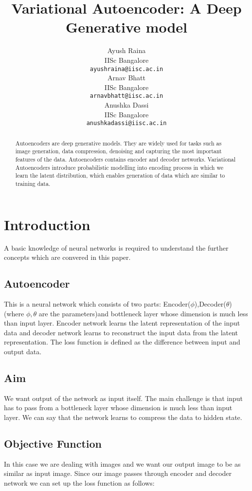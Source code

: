 \documentclass[10pt,a4paper]{article}
\title{Variational Autoencoder: A Deep Generative model}
\author{
  Ayush Raina \\
  IISc Bangalore \\
  \texttt{ayushraina@iisc.ac.in} \\
  \And
  Arnav Bhatt \\
  IISc Bangalore \\
  \texttt{arnavbhatt@iisc.ac.in} \\
  \AND
  Anushka Dassi \\
  IISc Bangalore \\
  \texttt{anushkadassi@iisc.ac.in} \\
}
\begin{document}
\maketitle


\begin{abstract}
  Autoencoders are deep generative models. They are widely used for tasks such as image generation, data compression, denoising and capturing the most important features of the data. Autoencoders contains encoder and decoder networks. Variational Autoencoders introduce probabilistic modelling into encoding process in which we learn the latent distribution, which enables generation of data which are similar to training data.
\end{abstract}


\section{Introduction}
A basic knowledge of neural networks is required to understand the further concepts which are convered in this paper.

\subsection{Autoencoder}
This is a neural network which consists of two parts: Encoder($\phi$),Decoder($\theta$) (where $\phi, \theta$ are the parameters)and bottleneck layer whose dimension is much less than input layer. Encoder network learns the latent representation of the input data and decoder network learns to reconstruct the input data from the latent representation. The loss function is defined as the difference between input and output data.

\subsection{Aim}
We want output of the network as input itself. The main challenge is that input has to pass from a bottleneck layer whose dimension is much less than input layer. We can say that the network learns to compress the data to hidden state.

\subsection{Objective Function}
In this case we are dealing with images and we want our output image to be as similar as input image. Since our image passes through encoder and decoder network we can set up the loss function as follows:
\end{document}
